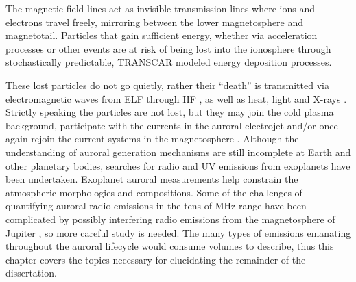 The magnetic field lines act as invisible transmission lines where ions and electrons travel freely, mirroring between the lower magnetosphere and magnetotail.
Particles that gain sufficient energy, whether via acceleration processes or other events are at risk of being lost into the ionosphere through stochastically predictable, TRANSCAR modeled energy deposition processes.

These lost particles do not go quietly, rather their ``death'' is transmitted via electromagnetic waves from ELF through HF \citep{labelle2002}, as well as heat, light and X-rays \citep{raymont2008}.
Strictly speaking the particles are not lost, but they may join the cold plasma background, participate with the currents in the auroral electrojet and/or once again rejoin the current systems in the magnetosphere \citep{hargreavesbook}.
Although the understanding of auroral generation mechanisms are still incomplete at Earth and other planetary bodies, searches for radio \citep{nichols2012} and UV \citep{france2010} emissions from exoplanets have been undertaken.
Exoplanet auroral measurements help constrain the atmospheric morphologies and compositions.
Some of the challenges of quantifying auroral radio emissions in the tens of MHz range have been complicated by possibly interfering radio emissions from the magnetosphere of Jupiter \citep{labelle2002}, so more careful study is needed.
The many types of emissions emanating throughout the auroral lifecycle would consume volumes to describe, thus this chapter covers the topics necessary for elucidating the remainder of the dissertation.

